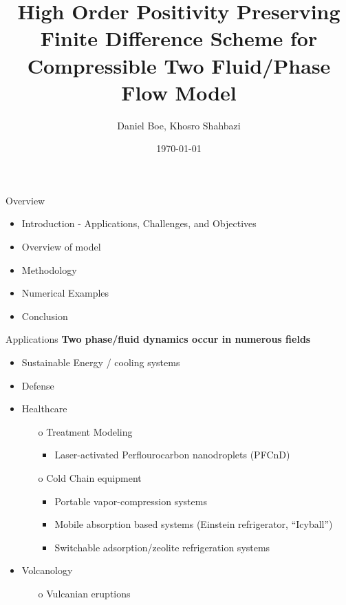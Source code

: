\documentclass[10pt]{beamer}
\title{High Order Positivity Preserving Finite Difference Scheme for Compressible Two Fluid/Phase Flow Model}
\date{\today}
\author{Daniel Boe, Khosro Shahbazi}
\institute{South Dakota School of Mines and Technology}
\begin{document}
\maketitle

\begin{frame}{Overview}
  \begin{itemize}
  \item Introduction - Applications, Challenges, and Objectives
  \item Overview of model
  \item Methodology
  \item Numerical Examples
  \item Conclusion
  \end{itemize}
  \end{frame}

  \begin{frame}{Applications}
    \textbf{Two phase/fluid dynamics occur in numerous fields}
    \begin{itemize}
      \item Sustainable Energy / cooling systems
      \item Defense
      \item Healthcare
      \begin{itemize}
        \item[o] Treatment Modeling
        \begin{itemize}
          \item Laser-activated Perflourocarbon nanodroplets (PFCnD)
        \end{itemize} 
        \item[o] Cold Chain equipment
        \begin{itemize}
          \item Portable vapor-compression systems
          \item Mobile absorption based systems (Einstein refrigerator, ``Icyball'')
          \item Switchable adsorption/zeolite refrigeration systems
        \end{itemize} 
      \end{itemize}
      \item Volcanology
        \begin{itemize}
          \item[o] Vulcanian eruptions
        \end{itemize}
    \end{itemize}
  \end{frame}
\end{document}
